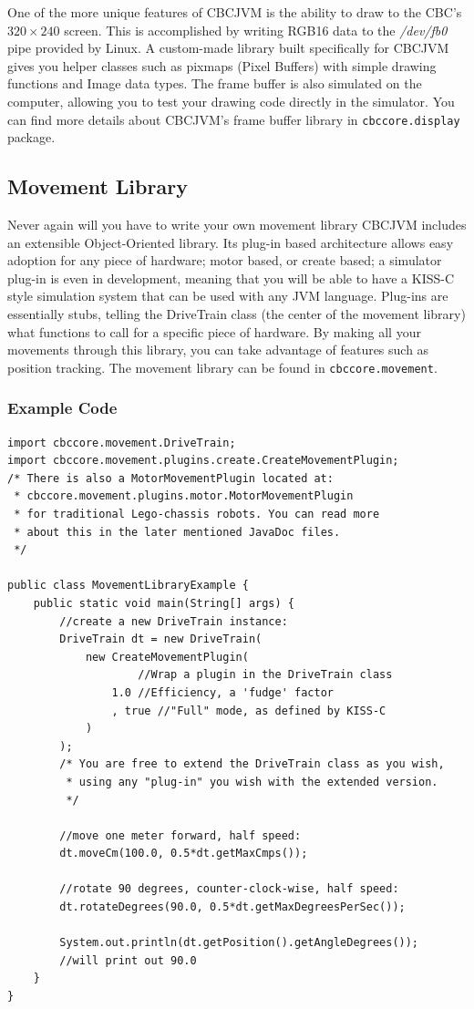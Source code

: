 \documentclass[12pt,letterpaper]{article}
\begin{document}
One of the more unique features of CBCJVM is the ability to draw to the CBC's $320 \times 240$ screen. This is accomplished by writing RGB16 data to the \textsl{/dev/fb0} pipe provided by Linux. A custom-made library built specifically for CBCJVM gives you helper classes such as pixmaps (Pixel Buffers) with simple drawing functions and Image data types. The frame buffer is also simulated on the computer, allowing you to test your drawing code directly in the simulator. You can find more details about CBCJVM's frame buffer library in \texttt{cbccore.display} package.



\subsection{Movement Library}

Never again will you have to write your own movement library CBCJVM includes an extensible Object-Oriented library. Its plug-in based architecture allows easy adoption for any piece of hardware; motor based, or create based; a simulator plug-in is even in development, meaning that you will be able to have a KISS-C style simulation system that can be used with any JVM language. Plug-ins are essentially stubs, telling the DriveTrain class (the center of the movement library) what functions to call for a specific piece of hardware. By making all your movements through this library, you can take advantage of features such as position tracking. The movement library can be found in \texttt{cbccore.movement}.

\subsubsection{Example Code}
\begin{verbatim}import cbccore.movement.DriveTrain;
import cbccore.movement.plugins.create.CreateMovementPlugin;
/* There is also a MotorMovementPlugin located at:
 * cbccore.movement.plugins.motor.MotorMovementPlugin
 * for traditional Lego-chassis robots. You can read more
 * about this in the later mentioned JavaDoc files.
 */

public class MovementLibraryExample {
    public static void main(String[] args) {
        //create a new DriveTrain instance:
        DriveTrain dt = new DriveTrain(
            new CreateMovementPlugin(
                    //Wrap a plugin in the DriveTrain class
                1.0 //Efficiency, a 'fudge' factor
                , true //"Full" mode, as defined by KISS-C
            )
        );
        /* You are free to extend the DriveTrain class as you wish,
         * using any "plug-in" you wish with the extended version.
         */
        
        //move one meter forward, half speed:
        dt.moveCm(100.0, 0.5*dt.getMaxCmps());
        
        //rotate 90 degrees, counter-clock-wise, half speed:
        dt.rotateDegrees(90.0, 0.5*dt.getMaxDegreesPerSec());
        
        System.out.println(dt.getPosition().getAngleDegrees());
        //will print out 90.0
    }
}
\end{verbatim}
\end{document}
